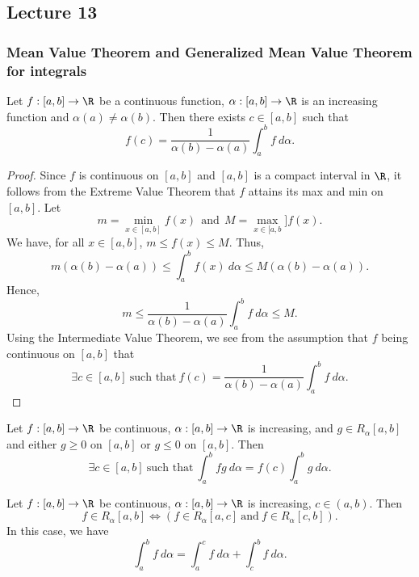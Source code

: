 \subsection{Lecture 13}

\subsubsection{Mean Value Theorem and Generalized Mean Value Theorem for integrals}\label{Mean Value Theorem and Generalized Mean Value Theorem for integrals}

\begin{theorem}\label{Mean Value Theorem and Generalize }
    Let \( f:[a,b] \to \R  \) be a continuous function, \( \alpha:[a,b] \to \R  \) is an increasing function and \( \alpha(a) \neq \alpha(b) \). Then there exists \( c \in [a,b] \) such that 
    \[  f(c) = \frac{ 1 }{  \alpha(b) - \alpha(a) }   \int_{ a }^{ b }  f  \ d \alpha. \]
\end{theorem}
\begin{proof}
    Since \( f  \) is continuous on \( [a,b] \) and \( [a,b] \) is a compact interval in \( \R  \), it follows from the Extreme Value Theorem that \( f  \) attains its max and min on \( [a,b] \). Let 
    \[  m = \min_{x \in [a,b]} f(x) \ \ \text{and} \ \ M = \max_{x \in [a,b}] f(x). \]
    We have, for all \( x \in [a,b] \), \( m \leq f(x) \leq M  \). Thus, 
    \[  m(\alpha(b) - \alpha(a)) \leq \int_{ a }^{ b }  f(x) \ d \alpha \leq M(\alpha(b) - \alpha(a)).\]
    Hence, 
    \[  m \leq \frac{ 1 }{  \alpha(b) - \alpha(a)  }  \int_{ a }^{ b }  f  \ d \alpha \leq M.  \]
    Using the Intermediate Value Theorem, we see from the assumption that \( f  \) being continuous on \( [a,b]  \) that
    \[  \exists c \in [a,b] \ \text{such that} \ f(c) = \frac{ 1 }{ \alpha(b) - \alpha(a) } \int_{ a }^{ b }  f \ d \alpha. \]
\end{proof}

\begin{theorem}
    Let \( f:[a,b] \to \R  \) be continuous, \( \alpha:[a,b] \to \R  \) is increasing, and \( g \in {R}_{\alpha}[a,b]  \) and either \( g \geq 0  \) on \( [a,b] \) or \( g \leq 0  \) on \( [a,b] \). Then
    \[  \exists c \in [a,b] \ \text{such that} \ \int_{ a }^{ b }  fg  \ d \alpha = f(c) \int_{ a }^{ b }  g  \ d \alpha. \]
\end{theorem}

\begin{theorem}\label{Additivity for R.S integrals}
    Let \( f:[a,b]  \to \R \) be continuous, \( \alpha:[a,b] \to \R  \) is increasing, \( c \in (a,b) \). Then
    \[  f \in {R}_{\alpha}[a,b] \iff (f \in {R}_{\alpha}[a,c] \ \text{and} \ f \in {R}_{\alpha}[c,b]). \]
    In this case, we have 
    \[  \int_{ a }^{ b }  f  \ d \alpha = \int_{ a }^{ c }  f  \ d \alpha + \int_{ c }^{ b  }  f \ d \alpha. \]
\end{theorem}

